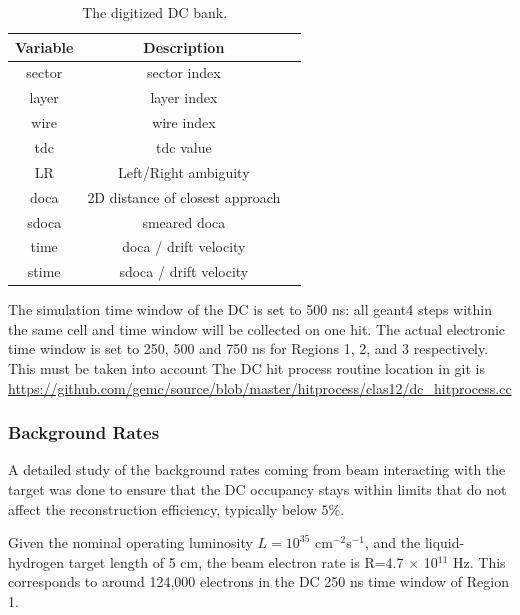 \begin{table}[h]
	\begin{center}
		\begin{tabular}{| c | c | c |}
			\hline \hline
			Variable   & Description \\
			\hline
               sector  &                    sector index   \\
                layer  &                     layer index   \\
                 wire  &                      wire index   \\
                  tdc  &                       tdc value   \\
                   LR  &            Left/Right ambiguity   \\
                 doca  & 2D distance of closest approach   \\
                sdoca  &                    smeared doca   \\
                 time  &           doca / drift velocity   \\
                stime  &          sdoca / drift velocity   \\
			\hline \hline
		\end{tabular}
	\end{center}
	\caption{The digitized DC bank.}\label{tab:dcBank}
\end{table}


The simulation time window of the DC is set to 500 ns: all geant4 steps within the same cell and time window will be collected on one hit.
The actual electronic time window is set to 250, 500 and 750 ns for Regions 1, 2, and 3 respectively. This must be taken into account
The DC hit process routine location in git is \url{https://github.com/gemc/source/blob/master/hitprocess/clas12/dc_hitprocess.cc}


\subsubsection{Background Rates}

A detailed study of the background rates coming from beam interacting with the target was done to ensure that the DC occupancy stays
within limits that do not affect the reconstruction efficiency, typically below $5\%$.

Given the nominal operating luminosity $L=10^{35}$ cm$^{-2}$s$^{-1}$, and the liquid-hydrogen target length of 5 cm, the beam electron rate
is R=4.7 $\times$ 10$^{11}$ Hz. This corresponds to around 124,000 electrons in the DC 250 ns time window of Region 1.

